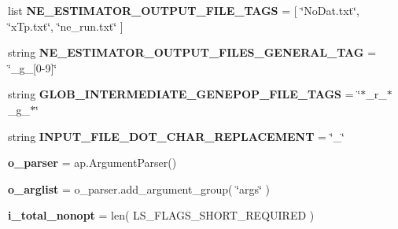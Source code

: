 \begin{DoxyCompactItemize}
\item 
list {\bfseries N\+E\+\_\+\+E\+S\+T\+I\+M\+A\+T\+O\+R\+\_\+\+O\+U\+T\+P\+U\+T\+\_\+\+F\+I\+L\+E\+\_\+\+T\+A\+GS} = \mbox{[} \char`\"{}No\+Dat.\+txt\char`\"{}, \char`\"{}x\+Tp.\+txt\char`\"{}, \char`\"{}ne\+\_\+run.\+txt\char`\"{} \mbox{]}\hypertarget{namespacenegui_1_1pgdriveneestimator_a167fb016fbc3709c4c778c4a5157cd06}{}\label{namespacenegui_1_1pgdriveneestimator_a167fb016fbc3709c4c778c4a5157cd06}

\item 
string {\bfseries N\+E\+\_\+\+E\+S\+T\+I\+M\+A\+T\+O\+R\+\_\+\+O\+U\+T\+P\+U\+T\+\_\+\+F\+I\+L\+E\+S\+\_\+\+G\+E\+N\+E\+R\+A\+L\+\_\+\+T\+AG} = \char`\"{}\+\_\+g\+\_\+\mbox{[}0-\/9\mbox{]}\char`\"{}\hypertarget{namespacenegui_1_1pgdriveneestimator_a059746bfc2b8e2fe32625877a1c83b34}{}\label{namespacenegui_1_1pgdriveneestimator_a059746bfc2b8e2fe32625877a1c83b34}

\item 
string {\bfseries G\+L\+O\+B\+\_\+\+I\+N\+T\+E\+R\+M\+E\+D\+I\+A\+T\+E\+\_\+\+G\+E\+N\+E\+P\+O\+P\+\_\+\+F\+I\+L\+E\+\_\+\+T\+A\+GS} = \char`\"{}$\ast$\+\_\+r\+\_\+$\ast$\+\_\+g\+\_\+$\ast$\char`\"{}\hypertarget{namespacenegui_1_1pgdriveneestimator_a1bb977fffd730588ade2008f702d6110}{}\label{namespacenegui_1_1pgdriveneestimator_a1bb977fffd730588ade2008f702d6110}

\item 
string {\bfseries I\+N\+P\+U\+T\+\_\+\+F\+I\+L\+E\+\_\+\+D\+O\+T\+\_\+\+C\+H\+A\+R\+\_\+\+R\+E\+P\+L\+A\+C\+E\+M\+E\+NT} = \char`\"{}\+\_\+\char`\"{}\hypertarget{namespacenegui_1_1pgdriveneestimator_ae33783002cdab9bc1d96f7cfe99a0ec9}{}\label{namespacenegui_1_1pgdriveneestimator_ae33783002cdab9bc1d96f7cfe99a0ec9}

\item 
{\bfseries o\+\_\+parser} = ap.\+Argument\+Parser()\hypertarget{namespacenegui_1_1pgdriveneestimator_a5d6d3756a8ddff6ece719654fb970636}{}\label{namespacenegui_1_1pgdriveneestimator_a5d6d3756a8ddff6ece719654fb970636}

\item 
{\bfseries o\+\_\+arglist} = o\+\_\+parser.\+add\+\_\+argument\+\_\+group( \char`\"{}args\char`\"{} )\hypertarget{namespacenegui_1_1pgdriveneestimator_a22a84c6d9023007cf69fd2e3d62dcb86}{}\label{namespacenegui_1_1pgdriveneestimator_a22a84c6d9023007cf69fd2e3d62dcb86}

\item 
{\bfseries i\+\_\+total\+\_\+nonopt} = len( L\+S\+\_\+\+F\+L\+A\+G\+S\+\_\+\+S\+H\+O\+R\+T\+\_\+\+R\+E\+Q\+U\+I\+R\+ED )\hypertarget{namespacenegui_1_1pgdriveneestimator_aa4e6982ff99236ac13e0af4c4d6e8839}{}\label{namespacenegui_1_1pgdriveneestimator_aa4e6982ff99236ac13e0af4c4d6e8839}


\end{DoxyCompactItemize}
